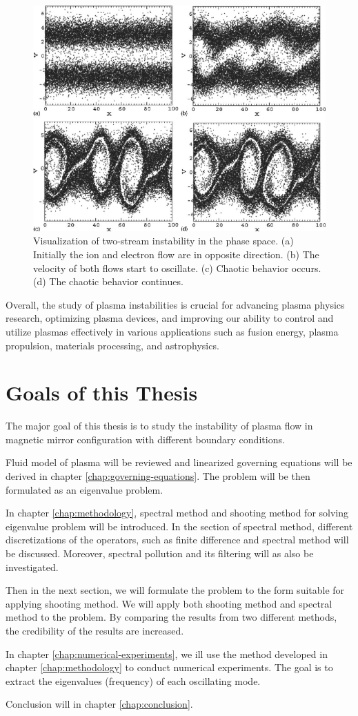 \begin{figure}[H]
	\centering
	\includegraphics[width=0.7\linewidth]{img/introduction/two_stream_instability}
	\caption{Visualization of two-stream instability in the phase space. (a) Initially the ion and electron flow are in opposite direction. (b) The velocity of both flows start to oscillate. (c) Chaotic behavior occurs. (d) The chaotic behavior continues. \cite{ha_nonlinear_2011}}
	\label{fig:two-stream-instability}
\end{figure}


Overall, the study of plasma instabilities is crucial for advancing plasma physics research, optimizing plasma devices, and improving our ability to control and utilize plasmas effectively in various applications such as fusion energy, plasma propulsion, materials processing, and astrophysics.

\section{Goals of this Thesis}
The major goal of this thesis is to study the instability of plasma flow in magnetic mirror configuration with different boundary conditions.

Fluid model of plasma will be reviewed and linearized governing equations will be derived in chapter \ref{chap:governing-equations}. The problem will be then formulated as an eigenvalue problem.

In chapter \ref{chap:methodology}, spectral method and shooting method for solving eigenvalue problem will be introduced. 
In the section of spectral method, different discretizations of the operators, such as finite difference and spectral method will be discussed.
Moreover, spectral pollution and its filtering will as also be investigated.

Then in the next section, we will formulate the problem to the form suitable for applying shooting method. We will apply both shooting method and spectral method to the problem.
By comparing the results from two different methods, the credibility of the results are increased.

In chapter \ref{chap:numerical-experiments}, we ill use the method developed in chapter \ref{chap:methodology} to conduct numerical experiments. The goal is to extract the eigenvalues (frequency) of each oscillating mode. 

Conclusion will in chapter \ref{chap:conclusion}.
